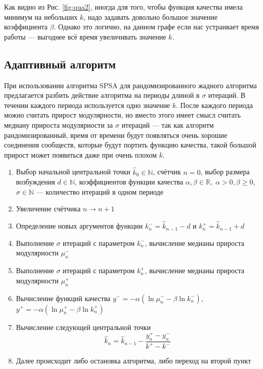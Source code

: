 Как видно из Рис. \ref{fig:qua2}, иногда для того, чтобы функция качества имела минимум на небольших $k$, надо задавать довольно большое значение коэффициента $\beta$. Однако это логично, на данном графе если нас устраивает время работы --- выгоднее всё время увеличивать значение $k$.



\subsection{Адаптивный алгоритм}

При использовании алгоритма SPSA для рандомизированного жадного алгоритма предлагается разбить действие алгоритма на периоды длиной в $\sigma$ итераций. В течении каждого периода используется одно значение $k$. После каждого периода можно считать прирост модулярности, но вместо этого имеет смысл считать медиану прироста модулярности за $\sigma$ итераций --- так как алгоритм рандомизированный, время от времени будут появляться очень хорошие соединения сообществ, которые будут портить функцию качества, такой большой прирост может появиться даже при очень плохом $k$.

\begin{enumerate}
	\item Выбор начальной центральной точки $\hat{k}_0 \in \mathbb{N}$, счётчик $n = 0$, выбор размера возбуждения $d \in \mathbb{N}$, коэффициентов функции качества $\alpha, \beta \in \mathbb{R},\; \alpha > 0, \beta \ge 0$, $\sigma \in \mathbb{N}$ --- количество итераций в одном периоде
	\item Увеличение счётчика $n \rightarrow n + 1$
	\item Определение новых аргументов функции $k_{n}^{-}=\hat{k}_{n - 1} - d$ и $k_{n}^{+}=\hat{k}_{n - 1} + d$
	\item Выполнение $\sigma$ итераций с параметром $k_{n}^{-}$, вычисление медианы прироста модулярности $\mu_n^{-}$
	\item Выполнение $\sigma$ итераций с параметром $k_{n}^{+}$, вычисление медианы прироста модулярности $\mu_n^{+}$
	\item Вычисление функций качества $y^{-} = -\alpha (\ln \mu_n^{-} - \beta \ln k_n^{-})$, $y^{+} = -\alpha (\ln \mu_n^{+} - \beta \ln k_n^{+})$
	\item Вычисление следующей центральной точки
	\begin{equation}
		\hat{k}_n = \hat{k}_{n - 1} - \frac{y_n^{+} - y_n^{-}}{k^{+} - k^{-}}
	\end{equation}
	\item Далее происходит либо остановка алгоритма, либо переход на второй пункт
\end{enumerate}